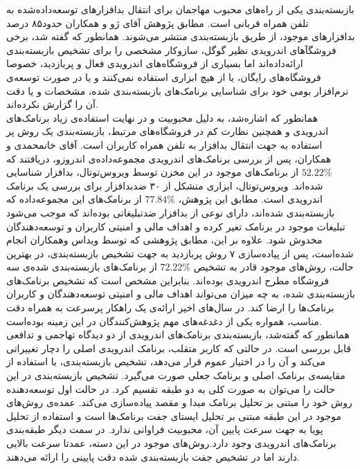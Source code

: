  بازبسته‌بندی یکی از راه‌های محبوب مهاجمان برای انتقال بدافزار‌های توسعه‌داده‌شده به تلفن‌ همراه قربانی‌ است. مطابق پژوهش آقای ژو و همکاران حدود۸۵ درصد بدافزار‌های موجود، از طریق بازبسته‌بندی منتشر می‌شوند. همانطور که گفته شد، برخی فروشگآ‌های اندرویدی نظیر گوگل، سازوکار مشخصی را برای تشخیص بازبسته‌بندی ارائه‌داده‌اند اما بسیاری از فروشگاه‌های اندرویدی فعال و پربازدید، خصوصا فروشگاه‌های رایگان، یا از هیچ ابزاری استفاده نمی‌کنند و یا در صورت توسعه‌ی نرم‌افزار بومی خود برای شناسایی برنامک‌های بازبسته‌بندی شده، مشخصات و یا دقت آن را گزارش نکرده‌اند.\\
 همانطور که اشاره‌شد، به دلیل محبوبیت و در نهایت استفاده‌ی زیاد برنامک‌های اندرویدی و همچنین نظارت کم در فروشگاه‌های مرتبط، بازبسته‌بندی یک روش پر استفاده به جهت انتقال بدافزار‌ به تلفن همراه کاربران است. آقای خانمحمدی و همکاران، پس از بررسی  برنامک‌های اندرویدی مجموعه‌داده‌ی اندروزو، دریافتند که
 $52.22\%$
 از برنامک‌های موجود در این مخزن توسط ویروس‌توتال، بدافزار شناسایی شده‌اند. ویروس‌توتال، ابزاری متشکل از ۳۰ ضد‌بدافزار برای بررسی یک برنامک اندرویدی است. مطابق این پژوهش،
 $77.84\%$
 از برنامک‌های این مجموعه‌داده که بازبسته‌بندی شده‌اند، دارای نوعی از بدافزار ضدتبلیغاتی بوده‌اند که موجب می‌شود تبلیغات موجود در برنامک تغیر کرده و اهداف مالی و امنیتی کاربران و توسعه‌دهندگان مخدوش شود. علاوه بر این، مطابق پژوهشی که توسط ویداس وهمکاران انجام شده‌است، پس از پیاده‌سازی ۷ روش پربازدید به جهت تشخیص بازبسته‌بندی، در بهترین حالت‌، روش‌های موجود قادر به تشخیص
 $72.22\%$
 از برنامک‌های بازبسته‌بندی شده‌ی سه فروشگاه مطرح اندرویدی بوده‌اند. بنابراین مشخص است که تشخیص برنامک‌های بازبسته‌بندی شده، به چه میزان می‌تواند اهداف مالی و امنیتی توسعه‌دهندگان و کاربران برنامک‌ها را ارضا کند. در سال‌های اخیر ارائه‌ی یک راهکار پرسرعت به همراه دقت مناسب، همواره یکی از دغدغه‌های مهم پژوهش‌کنندگان در این زمینه‌ بوده‌است.
 \\
 همانطور که گفته‌شد، بازبسته‌بندی برنامک‌های اندرویدی از دو دیدگاه تهاجمی و تدافعی قابل بررسی است. در حالتی که کاربر متقلب، برنامک اندرویدی اصلی را دچار تغییراتی می‌کند و آن را در اختیار عموم قرار می‌دهد،  تشخیص بازبسته‌بندی، با استفاده از مقایسه‌ی برنامک اصلی و برنامک جعلی صورت می‌گیرد. تشخیص بازبسته‌بندی در این حالت را می‌توان به صورت کلی  به دو طبقه تقسیم کرد. در حالت اول توسعه‌دهنده روش خود را مبتنی بر تحلیل برنامک مبدا و مقصد پیاده‌سازی می‌کند. عمده‌ی روش‌های موجود در این طبقه مبتنی بر تحلیل ایستا‌ی جفت‌ برنامک‌ها است و استفاده از تحلیل پویا به جهت سرعت پایین آن، محبوبیت فراوانی ندارد. در سمت دیگر طبقه‌بندی برنامک‌های اندرویدی وجود دارد.روش‌های موجود در این دسته، عمدتا سرعت بالایی دارند اما در تشخیص جفت بازبسته‌بندی شده دقت پایینی را ارائه می‌دهند.
